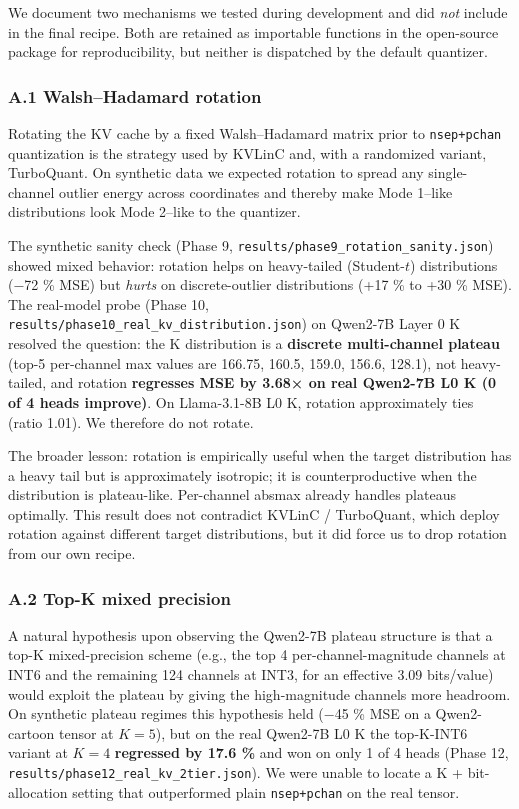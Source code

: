 We document two mechanisms we tested during development and did
\emph{not} include in the final recipe. Both are retained as importable
functions in the open-source package for reproducibility, but neither is
dispatched by the default quantizer.

\subsubsection{A.1 Walsh--Hadamard
rotation}\label{a.1-walshhadamard-rotation}

Rotating the KV cache by a fixed Walsh--Hadamard matrix prior to
\texttt{nsep+pchan} quantization is the strategy used by KVLinC and,
with a randomized variant, TurboQuant. On synthetic data we expected
rotation to spread any single-channel outlier energy across coordinates
and thereby make Mode 1--like distributions look Mode 2--like to the
quantizer.

The synthetic sanity check (Phase 9,
\texttt{results/phase9\_rotation\_sanity.json}) showed mixed behavior:
rotation helps on heavy-tailed (Student-\(t\)) distributions (−72 \%
MSE) but \emph{hurts} on discrete-outlier distributions (+17 \% to +30
\% MSE). The real-model probe (Phase 10,
\texttt{results/phase10\_real\_kv\_distribution.json}) on Qwen2-7B Layer
0 K resolved the question: the K distribution is a \textbf{discrete
multi-channel plateau} (top-5 per-channel max values are 166.75, 160.5,
159.0, 156.6, 128.1), not heavy-tailed, and rotation \textbf{regresses
MSE by 3.68× on real Qwen2-7B L0 K (0 of 4 heads improve)}. On
Llama-3.1-8B L0 K, rotation approximately ties (ratio 1.01). We
therefore do not rotate.

The broader lesson: rotation is empirically useful when the target
distribution has a heavy tail but is approximately isotropic; it is
counterproductive when the distribution is plateau-like. Per-channel
absmax already handles plateaus optimally. This result does not
contradict KVLinC / TurboQuant, which deploy rotation against different
target distributions, but it did force us to drop rotation from our own
recipe.

\subsubsection{A.2 Top-K mixed
precision}\label{a.2-top-k-mixed-precision}

A natural hypothesis upon observing the Qwen2-7B plateau structure is
that a top-K mixed-precision scheme (e.g., the top 4
per-channel-magnitude channels at INT6 and the remaining 124 channels at
INT3, for an effective 3.09 bits/value) would exploit the plateau by
giving the high-magnitude channels more headroom. On synthetic plateau
regimes this hypothesis held (−45 \% MSE on a Qwen2-cartoon tensor at
\(K = 5\)), but on the real Qwen2-7B L0 K the top-K-INT6 variant at
\(K = 4\) \textbf{regressed by 17.6 \%} and won on only 1 of 4 heads
(Phase 12, \texttt{results/phase12\_real\_kv\_2tier.json}). We were
unable to locate a K + bit-allocation setting that outperformed plain
\texttt{nsep+pchan} on the real tensor.

